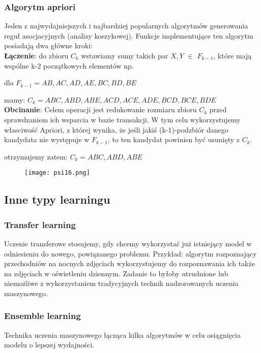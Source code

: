 \documentclass[a4paper,15pt]{article}
\begin{document}
\subsubsection{Algorytm apriori}

Jeden z najwydajniejszych i najbardziej popularnych algorytmów generowania reguł asocjacyjnych (analizy koszykowej). Funkcje implementujące ten algorytm posiadają dwa główne kroki: \\

\textbf{Łączenie}: do zbioru $C_k$ wstawiamy sumy takich par $X,Y$ $\in$ $F_{k-1}$, które mają wspólne k-2 początkowych elementów np.

dla $F_{k-1}={AB, AC, AD, AE, BC, BD, BE}$

mamy: $C_k={ABC, ABD, ABE, ACD, ACE,ADE, BCD, BCE, BDE}$ \\

\textbf{Obcinanie}: Celem operacji jest redukowanie rozmiaru zbioru $C_k$ przed sprawdzaniem ich wsparcia w bazie transakcji. W tym celu wykorzystujemy własciwość Apriori, z której wynika, że jeśli jakiś (k-1)-podzbiór danego kandydata nie występuje w $F_{k-1}$, to ten kandydat powinien być usunięty z $C_k$.

otrzymujemy zatem: $C_k={ABC, ABD, ABE}$ 

\begin{figure}[H]
\centerline{\texttt{[image: psi16.png]}}
\end{figure}






\subsection{Inne typy learningu}

\subsubsection{Transfer learning}
Uczenie transferowe stosujemy, gdy chcemy wykorzystać już istniejący model w odniesieniu do nowego, powiązanego problemu. Przykład: algorytm rozpoznający przechodniów na nocnych zdjęciach wykorzystujemy do rozpoznawania ich także na zdjęciach w oświetleniu dziennym. Zadanie to byłoby utrudnione lub niemożliwe z wykorzystaniem tradycyjnych technik nadzorowanych uczenia maszynowego. 

\subsubsection{Ensemble learning}
Technika uczenia maszynowego łącząca kilka algorytmów w celu osiągnięcia modelu o lepszej wydajności.
\end{document}
